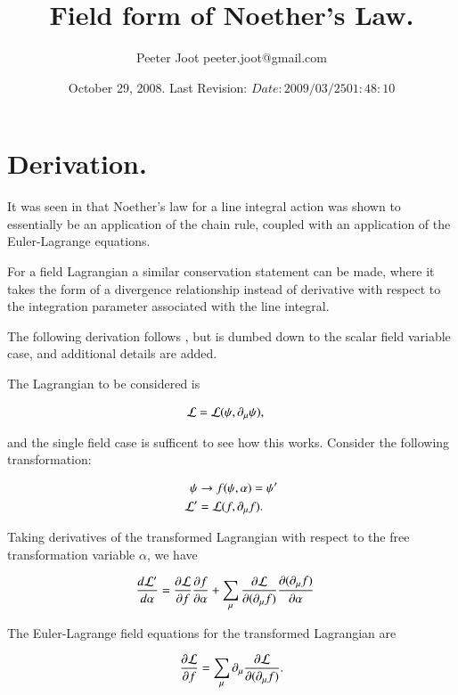 \documentclass{article}
\title{Field form of Noether's Law.}
\author{Peeter Joot \quad peeter.joot@gmail.com}
\date{ October 29, 2008.  Last Revision: $Date: 2009/03/25 01:48:10 $ }
\begin{document}
\maketitle{}
\tableofcontents

\section{ Derivation. }

It was seen in 
\cite{PJEulerLagrange} 
that Noether's law for a line integral action was shown
to essentially be an application of the chain rule, coupled with
an application of the Euler-Lagrange equations.

For a field Lagrangian a similar conservation statement can be made, where
it takes the form of a divergence relationship instead of derivative
with respect to the integration parameter associated with the line integral.

The following derivation follows \cite{doran2003gap}, but is dumbed down to the scalar field variable case, and
additional details are added.

The Lagrangian to be considered is

\begin{align*}
\mathcal{L} &= \mathcal{L}(\psi, \partial_\mu \psi),
\end{align*}

and the single field case is sufficent to see how this works.  Consider the following transformation:

\begin{align*}
\psi &\rightarrow f(\psi, \alpha) = \psi' \\
\mathcal{L}' &= \mathcal{L}(f, \partial_\mu f).
\end{align*}

Taking derivatives of the transformed Lagrangian with respect to the free transformation variable $\alpha$, we have

\begin{align}\label{eqn:noetherschain}
\frac{d\mathcal{L}'}{d\alpha}
&= \frac{\partial {\mathcal{L}}}{\partial {f}}\frac{\partial {f}}{\partial {\alpha}} + \sum_\mu \frac{\partial {\mathcal{L}}}{\partial {(\partial_\mu f)}}\frac{\partial {(\partial_\mu f)}}{\partial {\alpha}}
\end{align}

The Euler-Lagrange field equations for the transformed Lagrangian are

\begin{align}\label{eqn:eulerLag}
\frac{\partial {\mathcal{L}}}{\partial {f}} = \sum_\mu \partial_\mu \frac{\partial {\mathcal{L}}}{\partial {(\partial_\mu f)}}.
\end{align}
\end{document}
